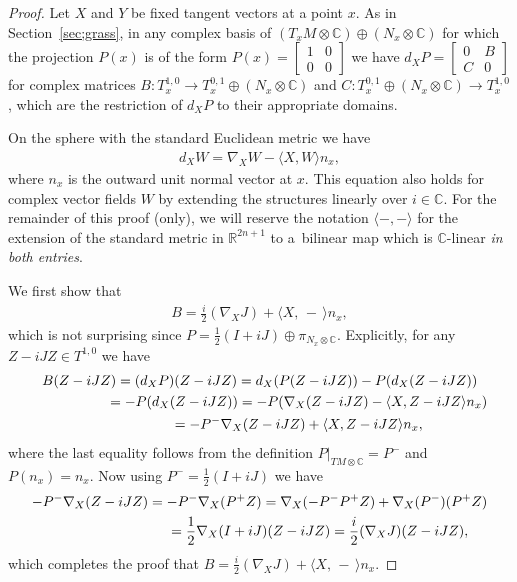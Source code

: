 \documentclass[11pt]{article}
\numberwithin{equation}{section}
\newcommand{\R}{\mathbb{R}}
\newcommand{\CC}{\mathbb{C}}
\begin{document}
\begin{proof} Let $X$ and $Y$ be fixed tangent vectors at a point $x$. As in Section~\ref{sec;grass}, in any complex basis of $(T_xM \otimes \CC) \oplus (N_x \otimes \CC)$ for which the projection $P(x)$ is of the form
$P(x) = \left[\begin{smallmatrix}
1 & 0 \\
0& 0
\end{smallmatrix}\right]$ we have
$d_X P =\left[
\begin{smallmatrix}
0 & B \\
C& 0
\end{smallmatrix}\right] $ for complex matrices $B\colon T^{1,0}_x \to T^{0,1}_x \oplus ( N_x \otimes \CC )$ and $C \colon T^{0,1}_x \oplus ( N_x \otimes \CC ) \to T^{1,0}_x$, which are the restriction of $d_X P$ to their appropriate domains.

On the sphere with the standard Euclidean metric we have
\begin{gather} \label{eq;NablaSphere}
d_X W = \nabla_X W - \langle X,W \rangle n_x,
\end{gather}
where $n_x$ is the outward unit normal vector at $x$. This equation also holds for complex vector fields $W$ by extending the structures linearly over $i \in \CC$. For the remainder of this proof (only), we will reserve the notation $ \langle - , - \rangle$ for the extension of the standard metric in $\R^{2n+1}$ to a~bilinear map which is $\CC$-linear \emph{in both entries}.

We first show that
\begin{gather*}
B= \frac i 2 (\nabla_X J) + \langle X , \, -\, \rangle n_x,
\end{gather*}
which is not surprising since $P = \frac 1 2 (I + i J) \oplus \pi_{N_x \otimes \CC}$.
Explicitly, for any $Z - i JZ \in T^{1,0} $ we have
\begin{gather*}
B(Z-iJZ) = (d_XP)(Z-iJZ) = d_X(P(Z - iJZ)) - P(d_X(Z-iJZ)) \\
\hphantom{B(Z-iJZ)}{} = - P(d_X(Z-iJZ)) = -P ( \nabla_X (Z-iJZ) - \langle X,Z - iJZ \rangle n_x )\\
\hphantom{B(Z-iJZ)}{}= - P^- \nabla_X (Z-iJZ) + \langle X,Z - iJZ \rangle n_x ,
\end{gather*}
where the last equality follows from the definition $P\big|_{TM \otimes \CC} = P^- $ and $P(n_x) = n_x$. Now using $P^- = \frac 1 2 (I + i J)$ we have
\begin{gather*}
 -P^- \nabla_X (Z-iJZ) = -P^- \nabla_X (P^+ Z) = \nabla_X ( -P^- P^+ Z) + \nabla_X (P^-) (P^+ Z) \\
 \hphantom{-P^- \nabla_X (Z-iJZ)}{} =\frac 1 2 \nabla_X (I +iJ) (Z-iJZ) = \frac i 2 (\nabla_X J )(Z- i J Z),
\end{gather*}
which completes the proof that $B= \frac i 2 (\nabla_X J) + \langle X , \, -\, \rangle n_x$.


\end{proof}
\end{document}
